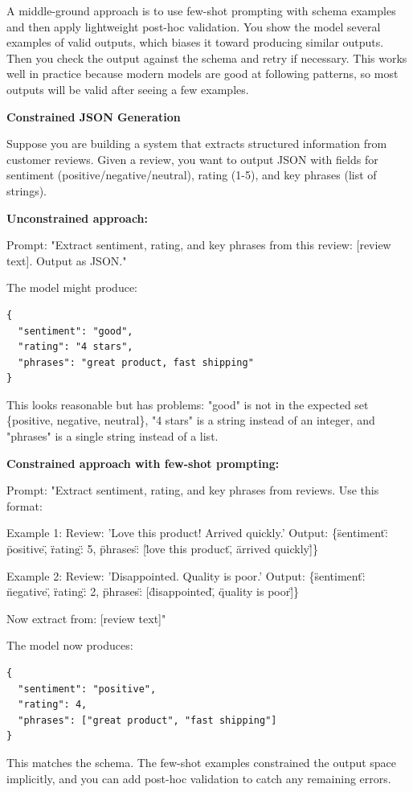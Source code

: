 A middle-ground approach is to use few-shot prompting with schema examples and then apply lightweight post-hoc validation. You show the model several examples of valid outputs, which biases it toward producing similar outputs. Then you check the output against the schema and retry if necessary. This works well in practice because modern models are good at following patterns, so most outputs will be valid after seeing a few examples.

\vspace{1.5em}

\begin{examplebox}
\textbf{Constrained JSON Generation}

\vspace{0.5em}

Suppose you are building a system that extracts structured information from customer reviews. Given a review, you want to output JSON with fields for sentiment (positive/negative/neutral), rating (1-5), and key phrases (list of strings).

\vspace{0.5em}

\textbf{Unconstrained approach:}

Prompt: "Extract sentiment, rating, and key phrases from this review: [review text]. Output as JSON."

The model might produce:

\begin{verbatim}
{
  "sentiment": "good",
  "rating": "4 stars",
  "phrases": "great product, fast shipping"
}
\end{verbatim}

This looks reasonable but has problems: "good" is not in the expected set \{positive, negative, neutral\}, "4 stars" is a string instead of an integer, and "phrases" is a single string instead of a list.

\vspace{0.5em}

\textbf{Constrained approach with few-shot prompting:}

Prompt: "Extract sentiment, rating, and key phrases from reviews. Use this format:

Example 1:
Review: 'Love this product! Arrived quickly.'
Output: \{\"sentiment\": \"positive\", \"rating\": 5, \"phrases\": [\"love this product\", \"arrived quickly\"]\}

Example 2:
Review: 'Disappointed. Quality is poor.'
Output: \{\"sentiment\": \"negative\", \"rating\": 2, \"phrases\": [\"disappointed\", \"quality is poor\"]\}

Now extract from: [review text]"

The model now produces:

\begin{verbatim}
{
  "sentiment": "positive",
  "rating": 4,
  "phrases": ["great product", "fast shipping"]
}
\end{verbatim}

This matches the schema. The few-shot examples constrained the output space implicitly, and you can add post-hoc validation to catch any remaining errors.
\end{examplebox}

